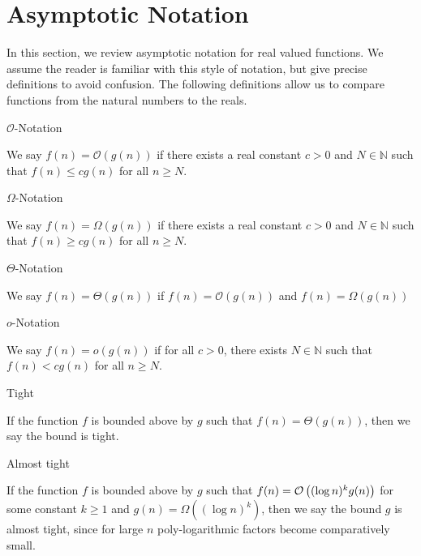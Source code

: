\section{Asymptotic Notation}

In this section, we review asymptotic notation for real valued functions. We assume the reader is familiar with this style of notation, but give precise definitions to avoid confusion. The following definitions allow us to compare functions from the natural numbers to the reals.

\begin{definition}
	$\mathcal{O}$-Notation

	\noindent
	We say $f(n) = \mathcal{O}(g(n))$ if there exists a real constant $c > 0$ and $N \in \mathbb{N}$ such that $f(n) \leq c g(n)$ for all $n \geq N$. 
\end{definition}

\begin{definition}
	$\Omega$-Notation

	\noindent
	We say $f(n) = \Omega(g(n))$ if there exists a real constant $c > 0$ and $N \in \mathbb{N}$ such that $f(n) \geq c g(n)$ for all $n \geq N$. 
\end{definition}

\begin{definition}
	$\Theta$-Notation

	\noindent
	We say $f(n) = \Theta(g(n))$ if $f(n) = \mathcal{O}(g(n))$ and $f(n) = \Omega(g(n))$
\end{definition}

\begin{definition}
	$o$-Notation

	\noindent
	We say $f(n) = o(g(n))$ if for all $c > 0$, there exists $N \in \mathbb{N}$ such that $f(n) < c g(n)$ for all $n \geq N$.
\end{definition}

\begin{definition}
	Tight

	\noindent
	If the function $f$ is bounded above by $g$ such that $f(n) = \Theta(g(n))$, then we say the bound is tight. 
\end{definition}

\begin{definition}
	Almost tight

	\noindent
	If the function $f$ is bounded above by $g$ such that $f(n) = \mathcal{O}\left((\log n)^k g(n)\right)$ for some constant $k \geq 1$ and $g(n) = \Omega((\log n)^k)$, then we say the bound $g$ is almost tight, since for large $n$ poly-logarithmic factors become comparatively small. 
\end{definition}

